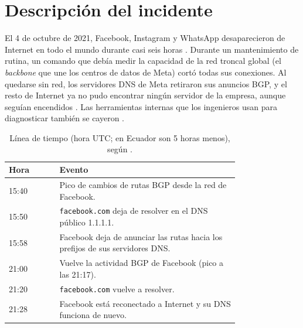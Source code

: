 \section{Descripción del incidente}

El 4 de octubre de 2021, Facebook, Instagram y WhatsApp desaparecieron de Internet en todo el mundo durante casi seis horas \cite{cloudflare2021}. Durante un mantenimiento de rutina, un comando que debía medir la capacidad de la red troncal global (el \emph{backbone} que une los centros de datos de Meta) cortó todas sus conexiones. Al quedarse sin red, los servidores DNS de Meta retiraron sus anuncios BGP, y el resto de Internet ya no pudo encontrar ningún servidor de la empresa, aunque seguían encendidos \cite{meta_detalles}. Las herramientas internas que los ingenieros usan para diagnosticar también se cayeron \cite{meta_actualizacion}.

\begin{table}[h]
\centering
\small
\renewcommand{\arraystretch}{1.15}
\caption{Línea de tiempo (hora UTC; en Ecuador son 5 horas menos), según \cite{cloudflare2021}.}
\label{tab:linea}
\begin{tabular}{@{}l p{0.78\linewidth}@{}}
\toprule
\textbf{Hora} & \textbf{Evento} \\
\midrule
15:40 & Pico de cambios de rutas BGP desde la red de Facebook. \\
15:50 & \texttt{facebook.com} deja de resolver en el DNS público 1.1.1.1. \\
15:58 & Facebook deja de anunciar las rutas hacia los prefijos de sus servidores DNS. \\
21:00 & Vuelve la actividad BGP de Facebook (pico a las 21:17). \\
21:20 & \texttt{facebook.com} vuelve a resolver. \\
21:28 & Facebook está reconectado a Internet y su DNS funciona de nuevo. \\
\bottomrule
\end{tabular}
\end{table}
